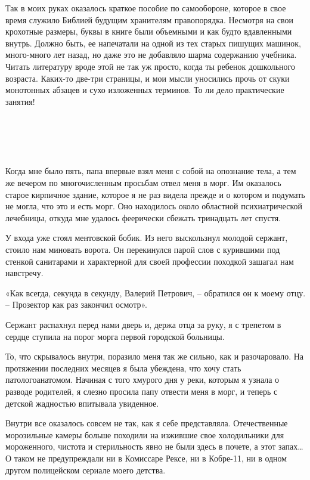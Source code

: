 \documentclass[
]{book}
\begin{document}
Так в моих руках оказалось краткое пособие по самообороне, которое в свое время служило Библией будущим хранителям правопорядка. Несмотря на свои крохотные размеры, буквы в книге были объемными и как будто вдавленными внутрь. Должно быть, ее напечатали на одной из тех старых пишущих машинок, много-много лет назад, но даже это не добавляло шарма содержанию учебника. Читать литературу вроде этой не так уж просто, когда ты ребенок дошкольного возраста. Каких-то две-три страницы, и мои мысли уносились прочь от скуки монотонных абзацев и сухо изложенных терминов. То ли дело практические занятия!

\hypertarget{chapter-69}{%
\chapter{~}\label{chapter-69}}

Когда мне было пять, папа впервые взял меня с собой на опознание тела, а тем же вечером по многочисленным просьбам отвел меня в морг. Им оказалось старое кирпичное здание, которое я не раз видела прежде и о котором и подумать не могла, что это и есть морг. Оно находилось около областной психиатрической лечебницы, откуда мне удалось феерически сбежать тринадцать лет спустя.

У входа уже стоял ментовской бобик. Из него выскользнул молодой сержант, стоило нам миновать ворота. Он перекинулся парой слов с курившими под стенкой санитарами и характерной для своей профессии походкой зашагал нам навстречу.

«Как всегда, секунда в секунду, Валерий Петрович, -- обратился он к моему отцу. -- Прозектор как раз закончил осмотр».

Сержант распахнул перед нами дверь и, держа отца за руку, я с трепетом в сердце ступила на порог морга первой городской больницы.

То, что скрывалось внутри, поразило меня так же сильно, как и разочаровало. На протяжении последних месяцев я была убеждена, что хочу стать патологоанатомом. Начиная с того хмурого дня у реки, которым я узнала о разводе родителей, я слезно просила папу отвести меня в морг, и теперь с детской жадностью впитывала увиденное.

Внутри все оказалось совсем не так, как я себе представляла. Отечественные морозильные камеры больше походили на изжившие свое холодильники для мороженного, чистота и стерильность явно не были здесь в почете, а этот запах\ldots{} О таком не предупреждали ни в Комиссаре Рексе, ни в Кобре-11, ни в одном другом полицейском сериале моего детства.
\end{document}
